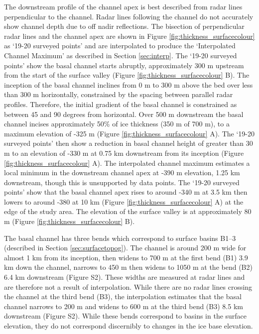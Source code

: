 The downstream profile of the channel apex is best described from radar lines perpendicular to the channel. Radar lines following the channel do not accurately show channel depth due to off nadir reflections.  The bisection of perpendicular radar lines and the channel apex are shown in Figure \ref{fig:thickness_surfacecolour} as `19-20 surveyed points' and are interpolated to produce the `Interpolated Channel Maximum' as described in Section \ref{sec:interp}.  The `19-20 surveyed points' show the basal channel starts abruptly, approximately 300 m upstream from the start of the surface valley (Figure \ref{fig:thickness_surfacecolour} B). The inception of the basal channel inclines from 0 m to 300 m above the bed over less than 300 m horizontally, constrained by the spacing between parallel radar profiles. Therefore, the initial gradient of the basal channel is constrained as between 45 and 90 degrees from horizontal. Over 500 m downstream the basal channel incises approximately 50\% of ice thickness (350 m of 700 m), to a maximum elevation of -325 m (Figure \ref{fig:thickness_surfacecolour} A).
The `19-20 surveyed points' then show a reduction in basal channel height of greater than 30 m to an elevation of -330 m at 0.75 km downstream from its inception (Figure \ref{fig:thickness_surfacecolour} A). The interpolated channel maximum estimates a local minimum in the downstream channel apex at -390 m elevation, 1.25 km downstream, though this is unsupported by data points.  The `19-20 surveyed points' show that the basal channel apex rises to around -340 m at 3.5 km then lowers to around -380 at 10 km (Figure \ref{fig:thickness_surfacecolour} A) at the edge of the study area. The elevation of the surface valley is at approximately 80 m (Figure \ref{fig:thickness_surfacecolour} B). 

The basal channel has three bends which correspond to surface basins B1--3 (described in Section \ref{sec:surfacetopog}). The channel is around 200 m wide for almost 1 km from its inception, then widens to 700 m at the first bend (B1) 3.9 km down the channel, narrows to 450 m then widens to 1050 m at the bend (B2) 6.4 km downstream (Figure S2). These widths are measured at radar lines and are therefore not a result of interpolation. While there are no radar lines crossing the channel at the third bend (B3), the interpolation estimates that the basal channel narrows to 200 m and widens to 600 m at the third bend (B3) 8.5 km downstream (Figure S2). While these bends correspond to basins in the surface elevation, they do not correspond discernibly to changes in the ice base elevation. 


